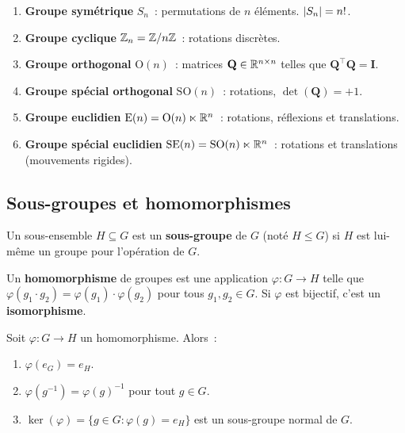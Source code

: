\begin{exemple}
\begin{enumerate}
    \item \textbf{Groupe sym\'etrique} $S_n$~: permutations de $n$ \'el\'ements.
          $\left| S_n \right| = n!$.
    \item \textbf{Groupe cyclique} $\mathbb{Z}_n = \mathbb{Z}/n\mathbb{Z}$~: rotations discr\`etes.
    \item \textbf{Groupe orthogonal} $\mathrm{O}(n)$~: matrices $\mathbf{Q} \in \mathbb{R}^{n \times n}$
          telles que $\mathbf{Q}^\top\mathbf{Q} = \mathbf{I}$.
    \item \textbf{Groupe sp\'ecial orthogonal} $\mathrm{SO}(n)$~: rotations,
          $\det(\mathbf{Q}) = +1$.
    \item \textbf{Groupe euclidien} $\mathrm{E}(n) = \mathrm{O}(n) \ltimes \mathbb{R}^n$~:
          rotations, r\'eflexions et translations.
    \item \textbf{Groupe sp\'ecial euclidien} $\mathrm{SE}(n) = \mathrm{SO}(n) \ltimes \mathbb{R}^n$~:
          rotations et translations (mouvements rigides).
\end{enumerate}
\end{exemple}

\subsection{Sous-groupes et homomorphismes}

\begin{definition}
Un sous-ensemble $H \subseteq G$ est un \textbf{sous-groupe} de $G$ (not\'e
$H \leq G$) si $H$ est lui-m\^eme un groupe pour l'op\'eration de $G$.
\end{definition}

\begin{definition}
Un \textbf{homomorphisme} de groupes est une application $\varphi: G \to H$
telle que $\varphi(g_1 \cdot g_2) = \varphi(g_1) \cdot \varphi(g_2)$ pour
tous $g_1, g_2 \in G$. Si $\varphi$ est bijectif, c'est un \textbf{isomorphisme}.
\end{definition}

\begin{proposition}
Soit $\varphi: G \to H$ un homomorphisme. Alors~:
\begin{enumerate}
    \item $\varphi(e_G) = e_H$.
    \item $\varphi(g^{-1}) = \varphi(g)^{-1}$ pour tout $g \in G$.
    \item $\ker(\varphi) = \{g \in G : \varphi(g) = e_H\}$ est un sous-groupe
          normal de $G$.
\end{enumerate}
\end{proposition}

